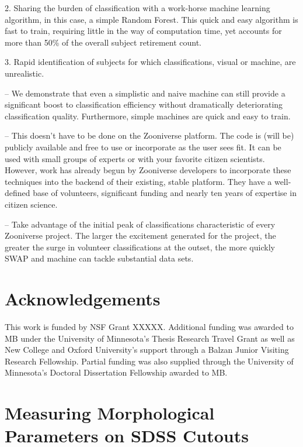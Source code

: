 \documentclass[twocolumn]{aastex6}
\begin{document}
2. Sharing the burden of classification with a work-horse machine learning algorithm, 
in this case, a simple Random Forest. This quick and easy algorithm is fast to train, 
requiring little in the way of computation time, yet accounts for more than 50\% of 
the overall subject retirement count. 

3. Rapid identification of subjects for which classifications, visual or machine, are
unrealistic. 


-- We demonstrate that even a simplistic and naive machine can still provide a 
significant boost to classification efficiency without dramatically deteriorating 
classification quality. Furthermore, simple machines are quick and easy to train. 

-- This doesn't have to be done on the Zooniverse platform. The code is (will be) 
publicly available and free to use or incorporate as the user sees fit. It can be used
with small groups of experts or with your favorite citizen scientists. However, 
work has already begun by Zooniverse developers to incorporate these techniques
into the backend of their existing, stable platform. They have a well-defined base 
of volunteers, significant funding and nearly ten years of expertise in citizen science. 


-- Take advantage of the initial peak of classifications characteristic of every
Zooniverse project. The larger the excitement generated for the project, the greater
the surge in volunteer classifications at the outset, the more quickly SWAP and
machine can tackle substantial data sets. 

\section{Acknowledgements}
This work is funded by NSF Grant XXXXX. Additional funding was awarded to MB 
under the University of Minnesota's Thesis Research Travel Grant as well as
New College and Oxford University's support through a Balzan Junior Visiting 
Research Fellowship. Partial funding was also supplied through the University of
Minnesota's Doctoral Dissertation Fellowship awarded to MB. 






\appendix

\section{Measuring Morphological Parameters on SDSS Cutouts}
\label{sec:Appendix}
\end{document}

